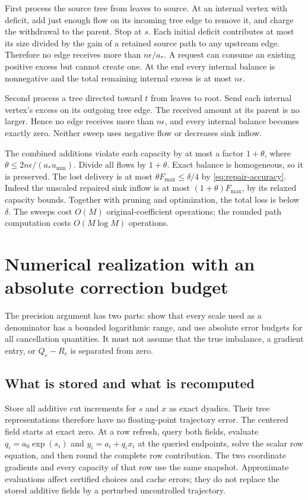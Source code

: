 \documentclass[11pt]{article}
\theoremstyle{definition}\newtheorem{definition}[theorem]{Definition}
\theoremstyle{remark}\newtheorem{remark}[theorem]{Remark}
\begin{document}
First process the source tree from leaves to source. At an internal
vertex with deficit, add just enough flow on its incoming tree edge
to remove it, and charge the withdrawal to the parent. Stop at $s$.
Each initial deficit contributes at most its size divided by the
gain of a retained source path to any upstream edge. Therefore no
edge receives more than $n\epsilon/a_*$. A request can consume an
existing positive excess but cannot create one. At the end every
internal balance is nonnegative and the total remaining internal
excess is at most $n\epsilon$.

Second process a tree directed toward $t$ from leaves to root. Send
each internal vertex's excess on its outgoing tree edge. The received
amount at its parent is no larger. Hence no edge receives more than
$n\epsilon$, and every internal balance becomes exactly zero.
Neither sweep uses negative flow or decreases sink inflow.

The combined additions violate each capacity by at most a factor
$1+\theta$, where
$\theta\le2n\epsilon/(a_*u_{\min})$.
Divide all flows by $1+\theta$. Exact balance is homogeneous, so it
is preserved. The lost delivery is at most
$\theta F_{\max}\le\delta/4$ by \eqref{eq:repair-accuracy}.
Indeed the unscaled repaired sink inflow is at most
$(1+\theta)F_{\max}$, by its relaxed capacity bounds.
Together with pruning and optimization, the total loss is below
$\delta$. The sweeps cost $O(M)$ original-coefficient operations;
the rounded path computation costs $O(M\log M)$ operations.



\section{Numerical realization with an absolute correction budget}
\label{app:numerics}

The precision argument has two parts: show that every scale used as
a denominator has a bounded logarithmic range, and use absolute
error budgets for all cancellation quantities. It must not assume
that the true imbalance, a gradient entry, or $Q_e-R_e$ is separated
from zero.

\subsection{What is stored and what is recomputed}

Store all additive cut increments for $s$ and $x$ as exact dyadics.
Their tree representations therefore have no floating-point trajectory
error. The centered field starts at exact zero. At a row refresh,
query both fields, evaluate $q_i=a_0\exp(s_i)$
and $y_i=a_i+q_ix_i$ at the queried endpoints, solve the scalar row
equation, and then round the complete row contribution. The two
coordinate gradients and every capacity of that row use the same
snapshot. Approximate evaluations affect certified choices and cache
errors; they do not replace the stored additive fields by a perturbed
uncontrolled trajectory.
\end{document}
